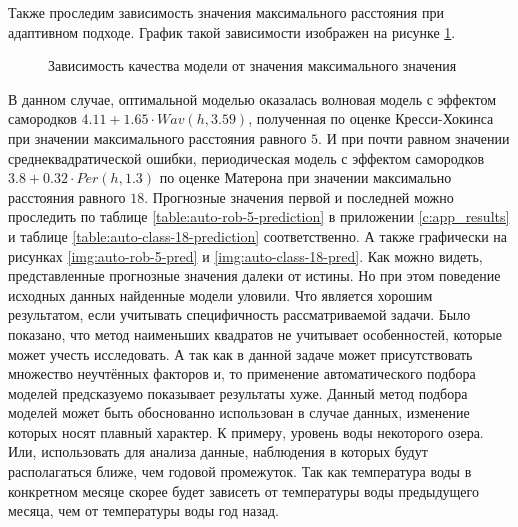Также проследим зависимость значения максимального расстояния при адаптивном подходе. График такой зависимости изображен на рисунке \ref{img:auto-mse-cutoff}.
\begin{figure}[ht]
\caption{Зависимость качества модели от значения максимального значения}
\label{img:auto-mse-cutoff}
\end{figure}
В данном случае, оптимальной моделью оказалась волновая модель с эффектом самородков $ 4.11 + 1.65 \cdot Wav(h, 3.59) $, полученная по оценке Кресси-Хокинса при значении максимального расстояния равного $ 5 $. И при почти равном значении среднеквадратической ошибки, периодическая модель с эффектом самородков $ 3.8 + 0.32 \cdot Per(h, 1.3) $ по оценке Матерона при значении максимально расстояния равного $ 18 $. Прогнозные значения первой и последней можно проследить по таблице \ref{table:auto-rob-5-prediction} в приложении \ref{c:app_results} и таблице \ref{table:auto-class-18-prediction} соответственно. А также графически на рисунках \ref{img:auto-rob-5-pred} и \ref{img:auto-class-18-pred}. Как можно видеть, представленные прогнозные значения далеки от истины. Но при этом поведение исходных данных найденные модели уловили. Что является хорошим результатом, если учитывать специфичность рассматриваемой задачи. Было показано, что метод наименьших квадратов не учитывает особенностей, которые может учесть исследовать. А так как в данной задаче может присутствовать множество неучтённых факторов и, то применение автоматического подбора моделей предсказуемо показывает результаты хуже. Данный метод подбора моделей может быть обоснованно использован в случае данных, изменение которых носят плавный характер. К примеру, уровень воды некоторого озера. Или, использовать для анализа данные, наблюдения в которых будут располагаться ближе, чем годовой промежуток. Так как температура воды в конкретном месяце скорее будет зависеть от температуры воды предыдущего месяца, чем от температуры воды год назад.

